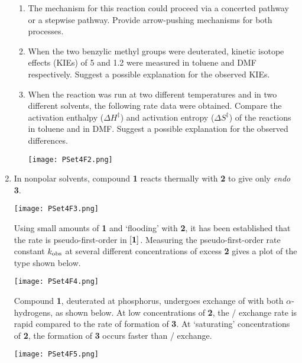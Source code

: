 \documentclass[../psets.tex]{subfiles}
\begin{document}
\begin{enumerate}
\begin{center}
    \end{center}
    \begin{enumerate}
        \item The mechanism for this reaction could proceed via a concerted pathway or a stepwise pathway. Provide arrow-pushing mechanisms for both processes.
        \item When the two benzylic methyl groups were deuterated, kinetic isotope effects (KIEs) of 5 and 1.2 were measured in toluene and DMF respectively. Suggest a possible explanation for the observed KIEs.
        \item When the reaction was run at two different temperatures and in two different solvents, the following rate data were obtained. Compare the activation enthalpy ($\Delta H^\ddagger$) and activation entropy ($\Delta S^\ddagger$) of the reactions in toluene and in DMF. Suggest a possible explanation for the observed differences.
        \begin{center}
            \texttt{[image: PSet4F2.png]}
        \end{center}
    \end{enumerate}
    \pagebreak
    \item In nonpolar solvents, compound \textbf{1} reacts thermally with \textbf{2} to give only \emph{endo} \textbf{3}.
    \begin{center}
        \texttt{[image: PSet4F3.png]}
    \end{center}
    Using small amounts of \textbf{1} and `flooding' with \textbf{2}, it has been established that the rate is pseudo-first-order in $\cnc{\textbf{1}}$. Measuring the pseudo-first-order rate constant $k_\textup{obs}$ at several different concentrations of excess \textbf{2} gives a plot of the type shown below.
    \begin{center}
        \texttt{[image: PSet4F4.png]}
    \end{center}
    Compound \textbf{1}, deuterated at phosphorus, undergoes exchange of  with both $\alpha$-hydrogens, as shown below. At low concentrations of \textbf{2}, the / exchange rate is rapid compared to the rate of formation of \textbf{3}. At `saturating' concentrations of \textbf{2}, the formation of \textbf{3} occurs faster than / exchange.
    \begin{center}
        \texttt{[image: PSet4F5.png]}
    \end{center}
    \begin{enumerate}

\end{enumerate}
\end{enumerate}
\end{document}
